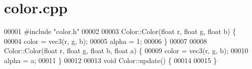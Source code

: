 \section{color.\+cpp}
\label{color_8cpp_source}

\begin{DoxyCode}
00001 \textcolor{preprocessor}{#include "color.h"}
00002 
00003 Color::Color(\textcolor{keywordtype}{float} r, \textcolor{keywordtype}{float} g, \textcolor{keywordtype}{float} b) \{
00004     color = vec3(r, g, b);
00005     alpha = 1;
00006 \}
00007 
00008 Color::Color(\textcolor{keywordtype}{float} r, \textcolor{keywordtype}{float} g, \textcolor{keywordtype}{float} b, \textcolor{keywordtype}{float} a) \{
00009     color = vec3(r, g, b);
00010     alpha = a;
00011 \}
00012 
00013 \textcolor{keywordtype}{void} Color::update() \{
00014 
00015 \}
\end{DoxyCode}
